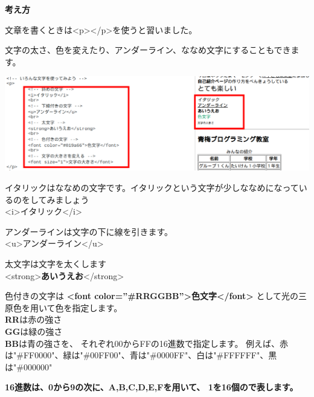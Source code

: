 \documentclass[a4paper,12pt]{jarticle}
\begin{document}
\flushleft
\textbf{考え方}



文章を書くときは{\textless}p{\textgreater}{\textless}/p{\textgreater}を使うと習いました。

文字の太さ、色を変えたり、アンダーライン、ななめ文字にすることもできます。

\centering
\includegraphics[width=14.284cm]{textbook-img186.png}

\bigskip

\flushleft

イタリックはななめの文字です。イタリックという文字が少しななめになっているのをしてみましょう\\
{\textless}i{\textgreater}イタリック{\textless}/i{\textgreater}\\

\bigskip

アンダーラインは文字の下に線を引きます。\\
{\textless}u{\textgreater}アンダーライン{\textless}/u{\textgreater}\\

\bigskip

太文字は文字を太くします\\
{\textless}strong{\textgreater}\textbf{あいうえお}{\textless}/strong{\textgreater}


\bigskip
色付きの文字は
\textbf{{\textless}font color=”\#RRGGBB”{\textgreater}色文字{\textless}/font{\textgreater}}
として光の三原色を用いて色を指定します。\\
\textbf{RR}は赤の強さ\\
\textbf{GG}は緑の強さ\\
\textbf{BB}は青の強さを、
それぞれ00からFFの16進数で指定します。
例えば、赤は"\#FF0000"、緑は"\#00FF00"、青は"\#0000FF"、白は"\#FFFFFF"、黒は"\#000000"

\bigskip
\textbf{16進数は、0から9の次に、A,B,C,D,E,Fを用いて、
  1を16個ので表します。}

\bigskip
\end{document}
